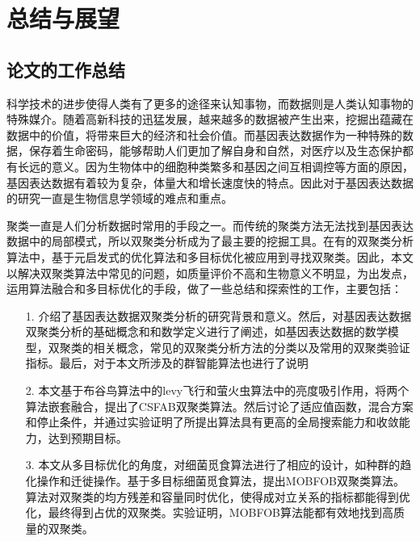 \chapter{总结与展望}
\section{论文的工作总结}
科学技术的进步使得人类有了更多的途径来认知事物，而数据则是人类认知事物的特殊媒介。随着高新科技的迅猛发展，越来越多的数据被产生出来，挖掘出蕴藏在数据中的价值，将带来巨大的经济和社会价值。而基因表达数据作为一种特殊的数据，保存着生命密码，能够帮助人们更加了解自身和自然，对医疗以及生态保护都有长远的意义。因为生物体中的细胞种类繁多和基因之间互相调控等方面的原因，基因表达数据有着较为复杂，体量大和增长速度快的特点。因此对于基因表达数据的研究一直是生物信息学领域的难点和重点。

聚类一直是人们分析数据时常用的手段之一。而传统的聚类方法无法找到基因表达数据中的局部模式，所以双聚类分析成为了最主要的挖掘工具。在有的双聚类分析算法中，基于元启发式的优化算法和多目标优化被应用到寻找双聚类。因此，本文以解决双聚类算法中常见的问题，如质量评价不高和生物意义不明显，为出发点，运用算法融合和多目标优化的手段，做了一些总结和探索性的工作，主要包括：
\begin{itemize}
    \item[1.]{介绍了基因表达数据双聚类分析的研究背景和意义。然后，对基因表达数据双聚类分析的基础概念和和数学定义进行了阐述，如基因表达数据的数学模型，双聚类的相关概念，常见的双聚类分析方法的分类以及常用的双聚类验证指标。最后，对于本文所涉及的群智能算法也进行了说明}  

    \item[2.]{本文基于布谷鸟算法中的levy飞行和萤火虫算法中的亮度吸引作用，将两个算法嵌套融合，提出了CSFAB双聚类算法。然后讨论了适应值函数，混合方案和停止条件，并通过实验证明了所提出算法具有更高的全局搜索能力和收敛能力，达到预期目标。}

    \item[3.]{本文从多目标优化的角度，对细菌觅食算法进行了相应的设计，如种群的趋化操作和迁徙操作。基于多目标细菌觅食算法，提出MOBFOB双聚类算法。算法对双聚类的均方残差和容量同时优化，使得成对立关系的指标都能得到优化，最终得到占优的双聚类。实验证明，MOBFOB算法能都有效地找到高质量的双聚类。}
    
\end{itemize}
